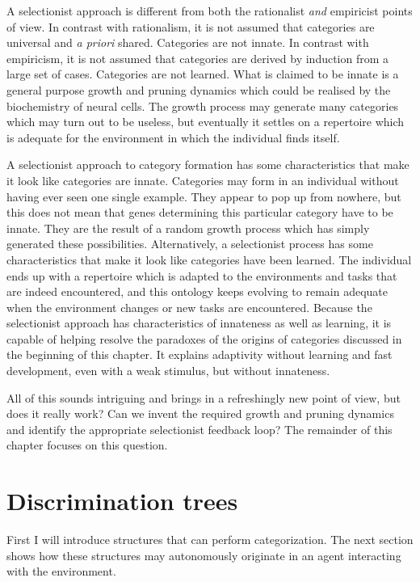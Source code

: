 A selectionist approach is different from 
both the rationalist {\it and} empiricist points of view.
In contrast with rationalism, it is not assumed that categories are
universal and {\it a priori} shared. Categories are not innate. 
In contrast with empiricism, it is not assumed that 
categories are derived by induction from a large 
set of cases. Categories are not learned. What is 
claimed to be innate is a general purpose growth and pruning
dynamics which could be realised by the biochemistry of
neural cells. The growth process may generate many categories 
which may turn out to 
be useless, but eventually it settles on a repertoire
which is adequate for the environment in which the 
individual finds itself. 

A selectionist approach to category formation has some 
characteristics that make it look like categories are 
innate. Categories may form in an individual
without having ever seen one single example. They
appear to pop up from nowhere, but this does not 
mean that genes determining this particular category have 
to be innate. They are the result of a random growth process
which has simply generated these possibilities. 
Alternatively, a selectionist process has some characteristics
that make it look like categories have been learned.
The individual ends up with a repertoire
which is adapted to 
the environments and tasks that are indeed encountered, and 
this ontology keeps evolving to remain adequate when 
the environment changes or new tasks are encountered. 
Because the selectionist approach has characteristics
of innateness as well as learning, it is capable of helping
resolve the 
paradoxes of the origins of categories discussed in the 
beginning of this chapter.  
It explains adaptivity without learning and fast 
development, even with a weak stimulus, but without innateness. 

All of this sounds intriguing and brings in a refreshingly new 
point of view, but does it really work? Can we 
invent the required growth and pruning dynamics and 
identify the appropriate selectionist feedback loop? 
The remainder of this chapter focuses on this question. 

\section{Discrimination trees}

First I will introduce structures that can perform
categorization. The next section shows how these
structures may autonomously originate in an agent
interacting with the environment. \cite{discrimination trees}

